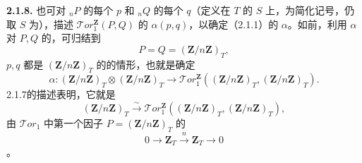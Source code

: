 \textbf{2.1.8.} 也可对 ${}_nP$ 的每个 $p$ 和 ${}_nQ$ 的每个 $q$（定义在 $T$ 的 $S$ 上，为简化记号，仍取 $S$ 为），描述 $\mathcal Tor_1^{\mathbf Z}(P,Q)$ 的 $\alpha(p,q)$，以确定（2.1.1）的 $\alpha$。如前，利用 $\alpha$ 对 $P,Q$ 的，可归结到
\[P=Q=(\mathbf Z/n\mathbf Z)_T,\]
$p,q$ 都是 $(\mathbf Z/n\mathbf Z)_T$ 的的情形，也就是确定
\[\alpha:(\mathbf Z/n\mathbf Z)_T\otimes(\mathbf Z/n\mathbf Z)_T
\longrightarrow\mathcal Tor_1^{\mathbf Z}((\mathbf Z/n\mathbf Z)_T,(\mathbf Z/n\mathbf Z)_T).\]
2.1.7的描述表明，它就是
\[(\mathbf Z/n\mathbf Z)_T\xrightarrow{\sim}
\mathcal Tor_1^{\mathbf Z}((\mathbf Z/n\mathbf Z)_T,(\mathbf Z/n\mathbf Z)_T),\tag{2.1.8.1}\]
由 $\mathcal Tor_1$ 中第一个因子 $P=(\mathbf Z/n\mathbf Z)_T$ 的
\[0\longrightarrow\mathbf Z_T\xrightarrow{n}\mathbf Z_T\longrightarrow0\tag{2.1.8.2}\]
。

